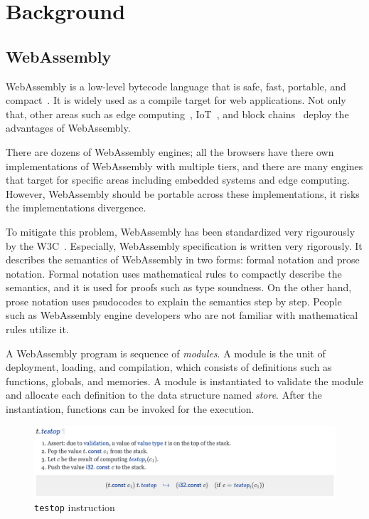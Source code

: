 
\chapter{Background}
\label{ch:background}
\noindent


\section{WebAssembly}

WebAssembly is a low-level bytecode language that is safe, fast, portable, and
compact~\cite{wasm}.
It is widely used as a compile target for web applications.
Not only that, other areas such as edge computing~\cite{wasm-edge},
IoT~\cite{wasm-iot}, and block chains~\cite{wasm-block} deploy the advantages
of WebAssembly.

There are dozens of WebAssembly engines; all the browsers have there own
implementations of WebAssembly with multiple tiers, and there are many engines
that target for specific areas including embedded systems and edge computing.
However, WebAssembly should be portable across these implementations, it risks
the implementations divergence.

To mitigate this problem, WebAssembly has been standardized very rigourously by
the W3C~\cite{wasm-w3c}.
Especially, WebAssembly specification is written very rigorously.
It describes the semantics of WebAssembly in two forms: formal notation and
prose notation.
Formal notation uses mathematical rules to compactly describe the semantics,
and it is used for proofs such as type soundness.
On the other hand, prose notation uses psudocodes to explain the semantics step
by step.
People such as WebAssembly engine developers who are not familiar with
mathematical rules utilize it.

A WebAssembly program is sequence of \textit{modules}.
A module is the unit of deployment, loading, and compilation, which consists of
definitions such as functions, globals, and memories.
A module is instantiated to validate the module and allocate each definition to
the data structure named \textit{store}.
After the instantiation, functions can be invoked for the execution.

\begin{figure}[t]
    \centerline{\includegraphics[width=15cm]{fig/testop}}
    \caption[Enter the caption title here]{\texttt{testop} instruction} \label{fig:testop}
\end{figure}

